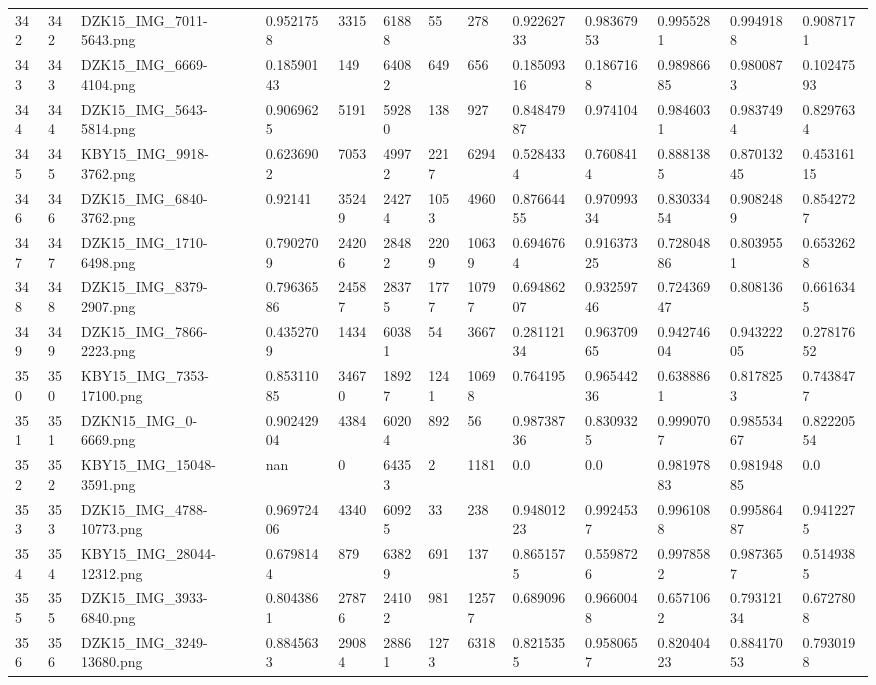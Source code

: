 \documentclass[11pt, a4paper, twoside]{report}
\begin{document}
\begin{longtable}[c]{@{}lllllllllllll@{}}
342 & 342 & DZK15\_IMG\_7011-5643.png & 0.9521758 & 3315 & 61888 & 55 & 278 & 0.92262733 & 0.98367953 & 0.9955281 & 0.9949188 & 0.9087171 \\
343 & 343 & DZK15\_IMG\_6669-4104.png & 0.18590143 & 149 & 64082 & 649 & 656 & 0.18509316 & 0.1867168 & 0.98986685 & 0.9800873 & 0.10247593 \\
344 & 344 & DZK15\_IMG\_5643-5814.png & 0.9069625 & 5191 & 59280 & 138 & 927 & 0.84847987 & 0.974104 & 0.9846031 & 0.9837494 & 0.8297634 \\
345 & 345 & KBY15\_IMG\_9918-3762.png & 0.6236902 & 7053 & 49972 & 2217 & 6294 & 0.5284334 & 0.7608414 & 0.8881385 & 0.87013245 & 0.45316115 \\
346 & 346 & DZK15\_IMG\_6840-3762.png & 0.92141 & 35249 & 24274 & 1053 & 4960 & 0.87664455 & 0.97099334 & 0.83033454 & 0.9082489 & 0.8542727 \\
347 & 347 & DZK15\_IMG\_1710-6498.png & 0.7902709 & 24206 & 28482 & 2209 & 10639 & 0.6946764 & 0.91637325 & 0.72804886 & 0.8039551 & 0.6532628 \\
348 & 348 & DZK15\_IMG\_8379-2907.png & 0.79636586 & 24587 & 28375 & 1777 & 10797 & 0.69486207 & 0.93259746 & 0.72436947 & 0.808136 & 0.6616345 \\
349 & 349 & DZK15\_IMG\_7866-2223.png & 0.4352709 & 1434 & 60381 & 54 & 3667 & 0.28112134 & 0.96370965 & 0.94274604 & 0.94322205 & 0.27817652 \\
350 & 350 & KBY15\_IMG\_7353-17100.png & 0.85311085 & 34670 & 18927 & 1241 & 10698 & 0.764195 & 0.96544236 & 0.6388861 & 0.8178253 & 0.7438477 \\
351 & 351 & DZKN15\_IMG\_0-6669.png & 0.90242904 & 4384 & 60204 & 892 & 56 & 0.98738736 & 0.8309325 & 0.9990707 & 0.98553467 & 0.82220554 \\
352 & 352 & KBY15\_IMG\_15048-3591.png & nan & 0 & 64353 & 2 & 1181 & 0.0 & 0.0 & 0.98197883 & 0.98194885 & 0.0 \\
353 & 353 & DZK15\_IMG\_4788-10773.png & 0.96972406 & 4340 & 60925 & 33 & 238 & 0.94801223 & 0.9924537 & 0.9961088 & 0.99586487 & 0.9412275 \\
354 & 354 & KBY15\_IMG\_28044-12312.png & 0.6798144 & 879 & 63829 & 691 & 137 & 0.8651575 & 0.5598726 & 0.9978582 & 0.9873657 & 0.5149385 \\
355 & 355 & DZK15\_IMG\_3933-6840.png & 0.8043861 & 27876 & 24102 & 981 & 12577 & 0.689096 & 0.9660048 & 0.6571062 & 0.79312134 & 0.6727808 \\
356 & 356 & DZK15\_IMG\_3249-13680.png & 0.8845633 & 29084 & 28861 & 1273 & 6318 & 0.8215355 & 0.9580657 & 0.82040423 & 0.88417053 & 0.7930198 \\

\end{longtable}
\end{document}
